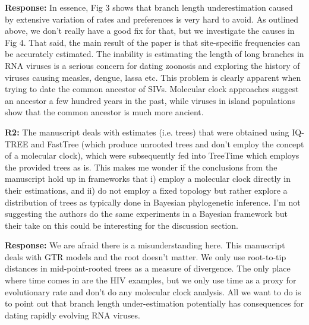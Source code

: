 \documentclass[aps,rmp,onecolumn]{revtex4-1}
\newcommand{\refb}[1]{\textbf{R2:} #1}
\newcommand{\response}[1]{{\color{black}\textbf{Response:} #1}}
\begin{document}
\response{In essence, Fig 3 shows that branch length underestimation caused by extensive variation of rates and preferences is very hard to avoid.
As outlined above, we don't really have a good fix for that, but we investigate the causes in Fig 4.
That said, the main result of the paper is that site-specific frequencies can be accurately estimated.
The inability is estimating the length of long branches in RNA viruses is a serious concern for dating zoonosis and exploring the history of viruses causing measles, dengue, lassa etc.
This problem is clearly apparent when trying to date the common ancestor of SIVs.
Molecular clock approaches suggest an ancestor a few hundred years in the past, while viruses in island populations show that the common ancestor is much more ancient.
}



\refb{The manuscript deals with estimates (i.e. trees) that were obtained using IQ-TREE and FastTree (which produce unrooted trees and don’t employ the concept of a molecular clock), which were subsequently fed into TreeTime which employs the provided trees as is. This makes me wonder if the conclusions from the manuscript hold up in frameworks that i) employ a molecular clock directly in their estimations, and ii) do not employ a fixed topology but rather explore a distribution of trees as typically done in Bayesian phylogenetic inference. I’m not suggesting the authors do the same experiments in a Bayesian framework but their take on this could be interesting for the discussion section.}

\response{
We are afraid there is a misunderstanding here.
This manuscript deals with GTR models and the root doesn't matter.
We only use root-to-tip distances in mid-point-rooted trees as a measure of divergence.
The only place where time comes in are the HIV examples, but we only use time as a proxy for evolutionary rate and don't do any molecular clock analysis.
All we want to do is to point out that branch length under-estimation potentially has consequences for dating rapidly evolving RNA viruses.}
\end{document}

